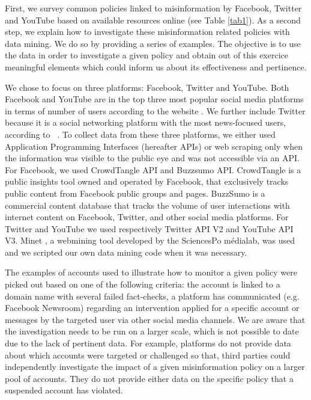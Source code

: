 \documentclass[Afour,sageh,times]{sagej}
\begin{document}
First, we survey common policies linked to misinformation by Facebook, Twitter and YouTube based on available resources online (see Table \ref{tab1}). As a second step, we explain how to investigate these misinformation related policies with data mining. We do so by providing a series of examples. The objective is to use the data in order to investigate a given policy and obtain out of this exercice meaningful elements which could inform us about its effectiveness and pertinence. 

We chose to focus on three platforms: Facebook, Twitter and YouTube. 
Both Facebook and YouTube are in the top three most popular social media platforms in terms of number of users according to the website \cite{Statistajan2021}. 
We further include Twitter because it is a social networking platform with the most news-focused users, according to ~\cite{pew1}. 
To collect data from these three platforms, we either used Application Programming Interfaces (hereafter APIs) or web scraping only when the information was visible to the public eye and was not accessible via an API. 
For Facebook, we used CrowdTangle API and Buzzsumo API. {CrowdTangle is a public insights tool owned and operated by Facebook, that exclusively tracks public content from Facebook public groups and pages.}  
BuzzSumo is a commercial content database that tracks the volume of user interactions with internet content on Facebook, Twitter, and other social media platforms. 
For Twitter and YouTube we used respectively  Twitter API V2 and YouTube API V3. 
Minet \cite{minet}, a webmining tool developed by the SciencesPo médialab, was used and we scripted our own data mining code when it was necessary. 

The examples of accounts used to illustrate how to monitor a given policy were picked out based on one of the following criteria: the account is linked to a domain name with several failed fact-checks, a platform has communicated (e.g. Facebook Newsroom) regarding an intervention applied for a specific account or messages by the targeted user via other social media channels. 
We are aware that the investigation needs to be run on a larger scale, which is not possible to date due to the lack of pertinent data. 
For example, platforms do not provide data about which accounts were targeted or challenged so that, third parties could independently investigate the impact of a given misinformation policy on a larger pool of accounts. 
They do not provide either data on the specific policy that a suspended account has violated.
\end{document}
